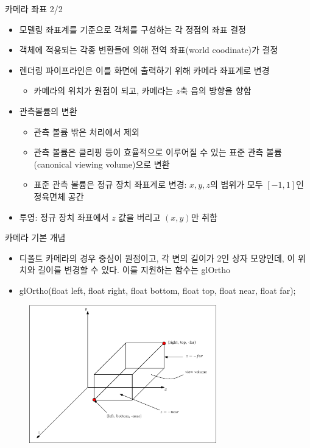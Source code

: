 \documentclass{beamer}
\begin{document}
\begin{frame}{카메라 좌표 2/2}

\begin{itemize}
\item 모델링 좌표계를 기준으로 객체를 구성하는 각 정점의 좌표 결정
\item 객체에 적용되는 각종 변환들에 의해 전역 좌표(world coodinate)가 결정
\item 렌더링 파이프라인은 이를 화면에 출력하기 위해 카메라 좌표계로 변경
	\begin{itemize}
	\item 카메라의 위치가 원점이 되고, 카메라는 $z$축 음의 방향을 향함
	\end{itemize}
\item 관측볼륨의 변환
	\begin{itemize}
	\item 관측 볼륨 밖은 처리에서 제외
	\item 관측 볼륨은 클리핑 등이 효율적으로 이루어질 수 있는 표준 관측 볼륨(canonical viewing volume)으로 변환
	\item 표준 관측 볼륨은 정규 장치 좌표계로 변경: $x, y, z$의 범위가 모두 $[-1,1]$인 정육면체 공간
	\end{itemize}
\item 투영: 정규 장치 좌표에서 $z$ 값을 버리고 $(x,y)$만 취함
\end{itemize}

\end{frame}

\begin{frame}{카메라 기본 개념}

{\small
\begin{itemize}
\item 디폴트 카메라의 경우 중심이 원점이고, 각 변의 길이가 2인 상자 모양인데, 이 위치와 길이를 변경할 수 있다. 이를 지원하는 함수는 {\sf glOrtho}
\item glOrtho(float left, float right, float bottom, float top, float near, float far);
\end{itemize}
}

\begin{figure}
    \includegraphics[height=6cm]{OGL_camera/cameraViewVolume.eps}
\end{figure}

\end{frame}
\end{document}
